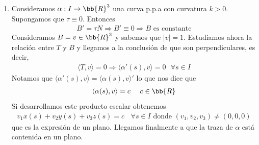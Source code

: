 \begin{ejercicio}
\begin{enumerate}
        \item[4\ bis.] Consideramos $\alpha :I\to \bb{R}^3$ una curva p.p.a con curvatura $k>0$. Supongamos que $\tau \equiv 0$. Entonces 
        \begin{gather*}
            B'=\tau N \Rightarrow B' \equiv 0 \Rightarrow B \text{ es constante}
        \end{gather*}
        Consideramos $B=v\in \bb{R}^3$ y sabemos que $|v|=1$. Estudiamos ahora la relación entre $T$ y $B$ y llegamos a la conclusión de que son perpendiculares, es decir,
        \begin{gather*}
            \langle T, v \rangle = 0 \Rightarrow \langle \alpha'(s), v \rangle = 0 \ \ \ \forall s \in I
        \end{gather*}
        Notamos que $\langle \alpha'(s), v \rangle = \langle \alpha(s), v \rangle'$ lo que nos dice que
        \begin{gather*}
            \langle \alpha(s), v \rangle = c \ \ \ \ c\in \bb{R}
        \end{gather*}
        Si desarrollamos este producto escalar obtenemos
        \begin{gather*}
            v_1x(s) + v_2y(s) + v_3z(s) = c \ \ \ \ \forall s\in I \text{ donde } (v_1,v_2,v_3)\neq (0,0,0)
        \end{gather*}
        que es la expresión de un plano. Llegamos finalmente a que la traza de $\alpha$ está contenida en un plano.


\end{enumerate}
\end{ejercicio}
